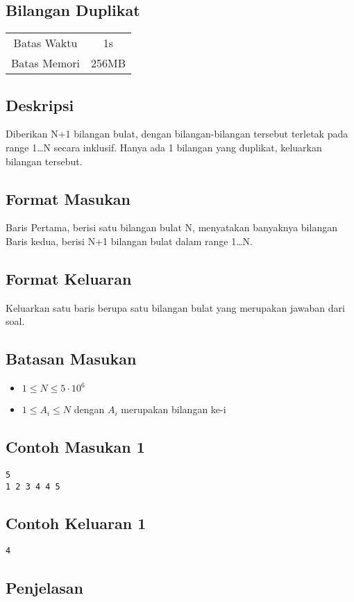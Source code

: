 \documentclass{article}
\begin{document}
\begin{center}
    \section*{Bilangan Duplikat} %

    \begin{tabular}{ | c c | }
        \hline
        Batas Waktu  & 1s \\    %
        Batas Memori & 256MB \\  %
        \hline
    \end{tabular}
\end{center}

\subsection*{Deskripsi}
Diberikan N+1 bilangan bulat, dengan bilangan-bilangan tersebut terletak pada range 1…N secara inklusif. Hanya ada 1 bilangan yang duplikat, keluarkan bilangan tersebut.

\subsection*{Format Masukan}
Baris Pertama, berisi satu bilangan bulat N, menyatakan banyaknya bilangan
Baris kedua, berisi N+1 bilangan bulat dalam range 1…N.


\subsection*{Format Keluaran}
Keluarkan satu baris berupa satu bilangan bulat yang merupakan jawaban dari soal.

\subsection*{Batasan Masukan}
\begin{itemize}
 \item $1 \leq N  \leq 5 \cdot 10^6$
 \item $1 \leq A_i  \leq N$ dengan $A_i$ merupakan bilangan ke-i
\end{itemize}

\linebreak
\begin{multicols}{2}
\subsection*{Contoh Masukan 1}
\begin{lstlisting}
5
1 2 3 4 4 5

\end{lstlisting}
\null
\columnbreak
\subsection*{Contoh Keluaran 1}
\begin{lstlisting}
4

\end{lstlisting}
\vfill
\null
\end{multicols}

\subsection*{Penjelasan}
\end{document}
